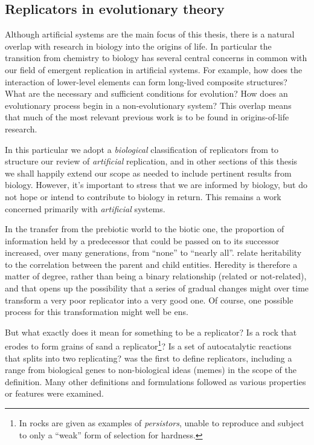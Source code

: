 \subsection{Replicators in evolutionary theory}\label{replicators-in-evolutionary-theory}

Although artificial systems are the main focus of this thesis, there is a natural overlap with research in biology into the origins of life. In particular the transition from chemistry to biology has several central concerns in common with our field of emergent replication in artificial systems. For example, how does the interaction of lower-level elements can form long-lived composite structures? What are the necessary and sufficient conditions for evolution? How does an evolutionary process begin in a non-evolutionary system? This overlap means that much of the most relevant previous work is to be found in origins-of-life research. 

In this particular  we adopt a \textit{biological} classification of replicators from \textcite{Zachar2010} to structure our review of \textit{artificial} replication, and in other sections of this thesis we shall happily extend our scope as needed to include pertinent results from biology. However, it's important to stress that we are informed by biology, but do not hope or intend to contribute to biology in return. This remains a work concerned primarily with \emph{artificial} systems. 

In the transfer from the prebiotic world to the biotic one, the proportion of information held by a predecessor that could be passed on to its successor increased, over many generations, from ``none'' to ``nearly all''. \Textcite{Vasas2012a} relate heritability to the correlation between the parent and child entities. Heredity is therefore a matter of degree, rather than being a binary relationship (related or not-related), and that opens up the possibility that a series of gradual changes might over time transform a very poor replicator into a very good one. Of course, one possible process for this transformation might well be \gls{ens}.

But what exactly does it mean for something to be a replicator? Is a rock that erodes to form grains of sand a replicator\footnote{In \textcite{Bourrat2015} rocks are given as examples of \emph{persistors}, unable to reproduce and subject to only a ``weak'' form of selection for hardness.}? Is a set of autocatalytic reactions that splits into two replicating? \Textcite{Dawkins1976} was the first to define replicators, including a range from biological genes to non-biological ideas (memes) in the scope of the definition. Many other definitions and formulations followed as various properties or features were examined. 

